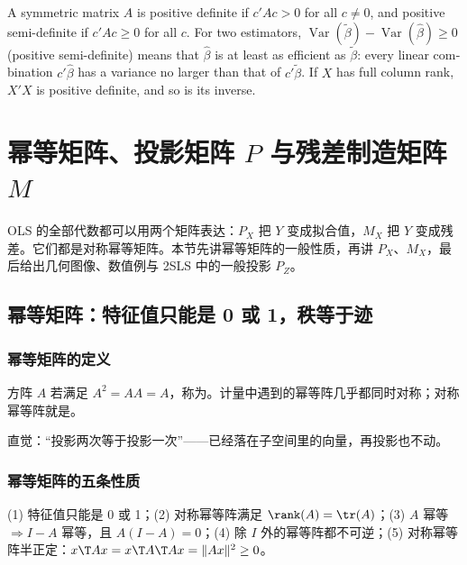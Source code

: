 \begin{english}
A symmetric matrix $A$ is positive definite if $c'Ac>0$ for all $c\neq0$, and positive semi-definite if $c'Ac\ge0$ for all $c$. For two estimators, $\operatorname{Var}(\tilde\beta)-\operatorname{Var}(\hat\beta)\ge0$ (positive semi-definite) means that $\hat\beta$ is at least as efficient as $\tilde\beta$: every linear combination $c'\hat\beta$ has a variance no larger than that of $c'\tilde\beta$. If $X$ has full column rank, $X'X$ is positive definite, and so is its inverse.
\end{english}

\section{幂等矩阵、投影矩阵 \texorpdfstring{$P$}{P} 与残差制造矩阵 \texorpdfstring{$M$}{M}}\label{sec:U01a-proj}

OLS 的全部代数都可以用两个矩阵表达：$P_X$ 把 $Y$ 变成拟合值，$M_X$ 把 $Y$ 变成残差。它们都是对称幂等矩阵。本节先讲幂等矩阵的一般性质，再讲 $P_X$、$M_X$，最后给出几何图像、数值例与 2SLS 中的一般投影 $P_Z$。

\subsection{幂等矩阵：特征值只能是 0 或 1，秩等于迹}

\subsubsection{幂等矩阵的定义}

\begin{defn}[幂等矩阵]\label{def:U01a-idem}
方阵 $A$ 若满足 $A^2=AA=A$，称为。计量中遇到的幂等阵几乎都同时对称；对称幂等阵就是。
\end{defn}
直觉：“投影两次等于投影一次”——已经落在子空间里的向量，再投影也不动。

\subsubsection{幂等矩阵的五条性质}

\begin{thm}[幂等矩阵的性质]\label{thm:U01a-idem}
(1) 特征值只能是 0 或 1；(2) 对称幂等阵满足 $\rank(A)=\tr(A)$；(3) $A$ 幂等 $\Rightarrow I-A$ 幂等，且 $A(I-A)=0$；(4) 除 $I$ 外的幂等阵都不可逆；(5) 对称幂等阵半正定：$x\T Ax=x\T A\T Ax=\|Ax\|^2\ge0$。
\end{thm}

